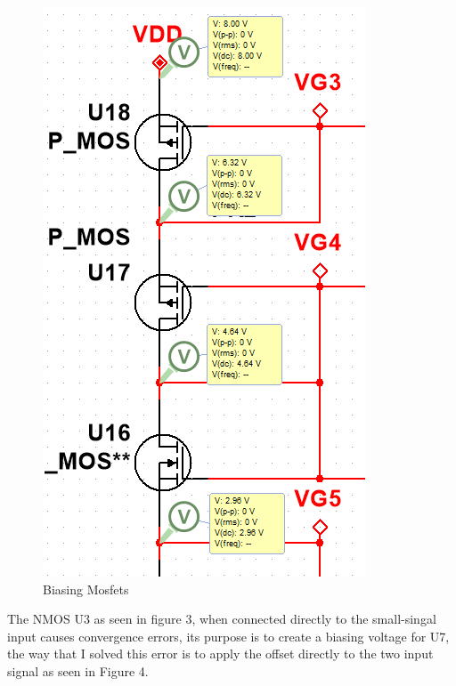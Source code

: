 \documentclass[12pt]{article}
\begin{document}
	
		\begin{figure}[h!]
		\label{fig:amp}
		\caption{Biasing Mosfets}
		\centering
		\includegraphics[width=.6\textwidth]{biasingdrop}
	\end{figure}
	
	\newpage
	
	The NMOS U3 as seen in figure 3, when connected directly to the small-singal input causes convergence errors, its purpose is to create a biasing voltage for U7, the way that I solved this error is to apply the offset directly to the two input signal as seen in Figure 4. 
	
\end{document}
